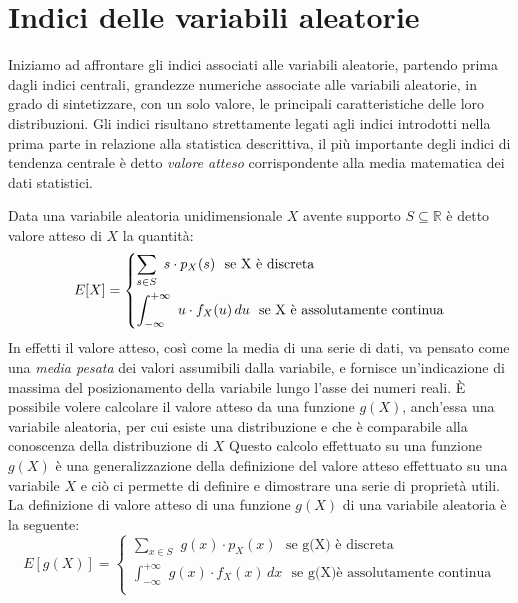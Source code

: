 \documentclass[a4paper,12pt, oneside]{book}
\newcommand{\numberset}{\mathbb}
\newcommand{\R}{\numberset{R}}
\begin{document}
\section{Indici delle variabili aleatorie}
Iniziamo ad affrontare gli indici associati alle variabili aleatorie, partendo prima dagli indici centrali,
grandezze numeriche associate alle variabili aleatorie, in grado di sintetizzare, con un solo valore,
le principali caratteristiche delle loro distribuzioni.\newline
Gli indici risultano strettamente legati agli indici introdotti nella prima parte in relazione alla 
statistica descrittiva, il più importante degli indici di tendenza centrale è detto \emph{valore atteso}
corrispondente alla media matematica dei dati statistici.

Data una variabile aleatoria unidimensionale $X$ avente supporto $S \subseteq \R$ è detto valore atteso di $X$ la quantità:
\[E[X] = \begin{dcases}
           \sum_{s\in S}\,\, s\cdot p_X(s) \,\,\mbox{ se X è discreta}\\
           \int_{-\infty}^{+\infty}\,\, u\cdot f_X(u)\,du \,\,\mbox{ se X è assolutamente continua}\\
         \end{dcases}\]
In effetti il valore atteso, così come la media di una serie di dati, va pensato come una \textit{media pesata}
dei valori assumibili dalla variabile, e fornisce un'indicazione di massima del posizionamento della variabile
lungo l'asse dei numeri reali.\newline
È possibile volere calcolare il valore atteso da una funzione $g(X)$, anch'essa una variabile aleatoria, per cui esiste
una distribuzione e che è comparabile alla conoscenza della distribuzione di $X$\newline
Questo calcolo effettuato su una funzione $g(X)$ è una generalizzazione della definizione del valore
atteso effettuato su una variabile $X$ e ciò ci permette di definire e dimostrare una serie di proprietà utili.\newline
La definizione di valore atteso di una funzione $g(X)$ di una variabile aleatoria è la seguente:
\[ E[g(X)] = \begin{cases}
                \sum_{x\in S}\,\, g(x)\cdot p_X(x) \,\,\mbox{ se g(X) è discreta}\\
                \int_{-\infty}^{+\infty}\,\, g(x)\cdot f_X(x)\,dx \,\,\mbox{ se g(X)è assolutamente continua}\\
            \end{cases}\]
\end{document}
